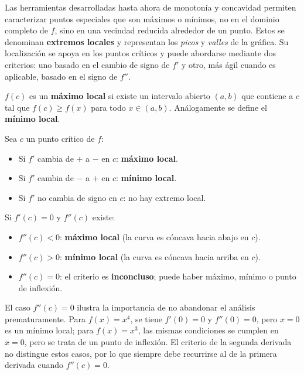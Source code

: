 Las herramientas desarrolladas hasta ahora de monotonía y concavidad
permiten caracterizar puntos especiales que son máximos o mínimos, no
en el dominio completo de $f$, sino en una vecindad reducida alrededor
de un punto. Estos se denominan \textbf{extremos locales} y representan
los \textit{picos} y \textit{valles} de la gráfica. Su localización se apoya en los
puntos críticos y puede abordarse mediante dos criterios: uno basado en
el cambio de signo de $f'$ y otro, más ágil cuando es aplicable, basado
en el signo de $f''$.

\begin{definition}
$f(c)$ es un \textbf{máximo local} si existe un intervalo abierto
$(a,b)$ que contiene a $c$ tal que $f(c)\geq f(x)$ para todo
$x\in(a,b)$. Análogamente se define el \textbf{mínimo local}.
\end{definition}

\begin{theorem}
Sea $c$ un punto crítico de $f$:
\begin{itemize}
    \item Si $f'$ cambia de $+$ a $-$ en $c$: \textbf{máximo local}.
    \item Si $f'$ cambia de $-$ a $+$ en $c$: \textbf{mínimo local}.
    \item Si $f'$ no cambia de signo en $c$: no hay extremo local.
\end{itemize}
\end{theorem}

\begin{theorem}
Si $f'(c)=0$ y $f''(c)$ existe:
\begin{itemize}
    \item $f''(c)<0$: \textbf{máximo local} (la curva es cóncava hacia
    abajo en $c$).
    \item $f''(c)>0$: \textbf{mínimo local} (la curva es cóncava hacia
    arriba en $c$).
    \item $f''(c)=0$: el criterio es \textbf{inconcluso}; puede haber
    máximo, mínimo o punto de inflexión.
\end{itemize}
\end{theorem}

\begin{rem}
El caso $f''(c)=0$ ilustra la importancia de no abandonar el análisis
prematuramente. Para $f(x)=x^4$, se tiene $f'(0)=0$ y $f''(0)=0$,
pero $x=0$ es un mínimo local; para $f(x)=x^3$, las mismas condiciones
se cumplen en $x=0$, pero se trata de un punto de inflexión. El criterio
de la segunda derivada no distingue estos casos, por lo que siempre debe
recurrirse al de la primera derivada cuando $f''(c)=0$.
\end{rem}

